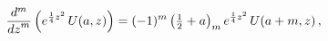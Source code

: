 \[\frac{{d}^{m}}{{dz}^{m}}\left(e^{\frac{1}{4}z^{2}}\mathop{U\/}\nolimits\!\left%
(a,z\right)\right)=(-1)^{m}\left(\tfrac{1}{2}+a\right)_{m}e^{\frac{1}{4}z^{2}}%
\mathop{U\/}\nolimits\!\left(a+m,z\right),\]